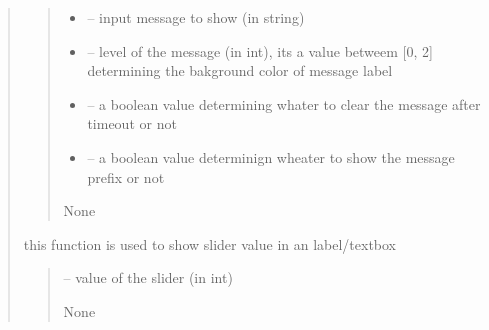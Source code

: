 \documentclass[letterpaper,10pt,english]{sphinxmanual}
\begin{document}
\begin{quote}
\begin{savenotes}
\begin{fulllineitems}
\begin{savenotes}
\begin{fulllineitems}
\begin{quote}
\begin{description}
\begin{itemize}
\item {} 
\sphinxAtStartPar
{} – input message to show (in string)

\item {} 
\sphinxAtStartPar
{} – level of the message (in int), its a value betweem {[}0, 2{]} determining the bakground color of message label

\item {} 
\sphinxAtStartPar
{} – a boolean value determining whater to clear the message after timeout or not

\item {} 
\sphinxAtStartPar
{} – a boolean value determinign wheater to show the message prefix or not

\end{itemize}

\sphinxAtStartPar
None

\end{description}\end{quote}

\end{fulllineitems}\end{savenotes}


\begin{savenotes}\begin{fulllineitems}
\label{\detokenize{setting/setting_UI:oxin.setting_UI.UI_main_window.show_value}}
\pysigstartsignatures
{}
\pysigstopsignatures
\sphinxAtStartPar
this function is used to show slider value in an label/textbox
\begin{quote}\begin{description}
\sphinxAtStartPar
{} – value of the slider (in int)

\sphinxAtStartPar
None

\end{description}\end{quote}

\end{fulllineitems}\end{savenotes}


\end{fulllineitems}
\end{savenotes}
\end{quote}
\end{document}

